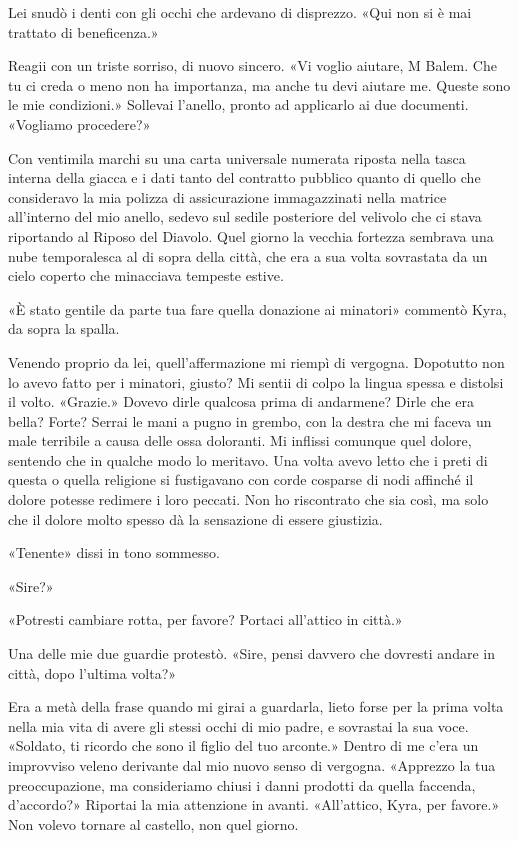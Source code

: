 Lei snudò i denti con gli occhi che ardevano di disprezzo. «Qui non si è
mai trattato di beneficenza.»

Reagii con un triste sorriso, di nuovo sincero. «Vi voglio aiutare, M
Balem. Che tu ci creda o meno non ha importanza, ma anche tu devi
aiutare me. Queste sono le mie condizioni.» Sollevai l'anello, pronto ad
applicarlo ai due documenti. «Vogliamo procedere?»

\begin{figure}
	\centering
	\def\svgwidth{\columnwidth}
	\scalebox{0.2}{}
\end{figure}

Con ventimila marchi su una carta universale numerata riposta nella
tasca interna della giacca e i dati tanto del contratto pubblico quanto
di quello che consideravo la mia polizza di assicurazione immagazzinati
nella matrice all'interno del mio anello, sedevo sul sedile posteriore
del velivolo che ci stava riportando al Riposo del Diavolo. Quel giorno
la vecchia fortezza sembrava una nube temporalesca al di sopra della
città, che era a sua volta sovrastata da un cielo coperto che minacciava
tempeste estive.

«È stato gentile da parte tua fare quella donazione ai minatori»
commentò Kyra, da sopra la spalla.

Venendo proprio da lei, quell'affermazione mi riempì di vergogna.
Dopotutto non lo avevo fatto per i minatori, giusto? Mi sentii di colpo
la lingua spessa e distolsi il volto. «Grazie.» Dovevo dirle qualcosa
prima di andarmene? Dirle che era bella? Forte? Serrai le mani a pugno
in grembo, con la destra che mi faceva un male terribile a causa delle
ossa doloranti. Mi inflissi comunque quel dolore, sentendo che in
qualche modo lo meritavo. Una volta avevo letto che i preti di questa o
quella religione si fustigavano con corde cosparse di nodi affinché il
dolore potesse redimere i loro peccati. Non ho riscontrato che sia così,
ma solo che il dolore molto spesso dà la sensazione di essere giustizia.

«Tenente» dissi in tono sommesso.

«Sire?»

«Potresti cambiare rotta, per favore? Portaci all'attico in città.»

Una delle mie due guardie protestò. «Sire, pensi davvero che dovresti
andare in città, dopo l'ultima volta?»

Era a metà della frase quando mi girai a guardarla, lieto forse per la
prima volta nella mia vita di avere gli stessi occhi di mio padre, e
sovrastai la sua voce. «Soldato, ti ricordo che sono il figlio del tuo
arconte.» Dentro di me c'era un improvviso veleno derivante dal mio
nuovo senso di vergogna. «Apprezzo la tua preoccupazione, ma
consideriamo chiusi i danni prodotti da quella faccenda, d'accordo?»
Riportai la mia attenzione in avanti. «All'attico, Kyra, per favore.»
Non volevo tornare al castello, non quel giorno.

